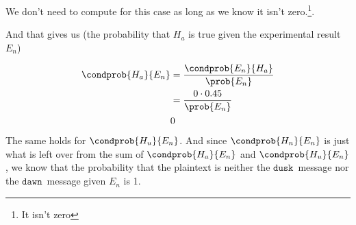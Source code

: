 \documentclass{article}
\newcommand\mdusk{\ensuremath{\mathtt{dusk}}}
\newcommand\mdawn{\ensuremath{\mathtt{dawn}}}
\begin{document}
We don't need to compute  for this case as long as we know it isn't zero.\footnote{It isn't zero}.

And that gives us  (the probability that $H_a$ is true given the experimental result $E_n$)

\begin{align*}
    \condprob{H_a}{E_n} &= \frac{\condprob{E_n}{H_a}}{\prob{E_n}} \\
                        &= \frac{0 \cdot 0.45}{\prob{E_n}} \\
                        & 0 
\end{align*}
The same holds for $\condprob{H_u}{E_n}$. And since $\condprob{H_n}{E_n}$ is just what is left over from the sum of  $\condprob{H_a}{E_n}$ and $\condprob{H_u}{E_n}$, we know that the probability that the plaintext is neither the \mdusk\ message nor the \mdawn\ message given $E_n$ is 1.
\end{document}
